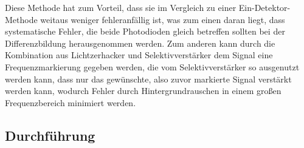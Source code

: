 Diese Methode hat zum Vorteil, dass sie im Vergleich zu einer Ein-Detektor-Methode weitaus weniger fehleranfällig ist, was zum einen daran liegt, dass systematische Fehler, die beide Photodioden gleich betreffen sollten bei der Differenzbildung herausgenommen werden. Zum anderen kann durch die Kombination aus Lichtzerhacker und Selektivverstärker dem Signal eine Frequenzmarkierung gegeben werden, die vom Selektivverstärker so ausgenutzt werden kann, dass nur das gewünschte, also zuvor markierte Signal verstärkt werden kann, wodurch Fehler durch Hintergrundrauschen in einem großen Frequenzbereich minimiert werden. 

\subsection{Durchführung}

